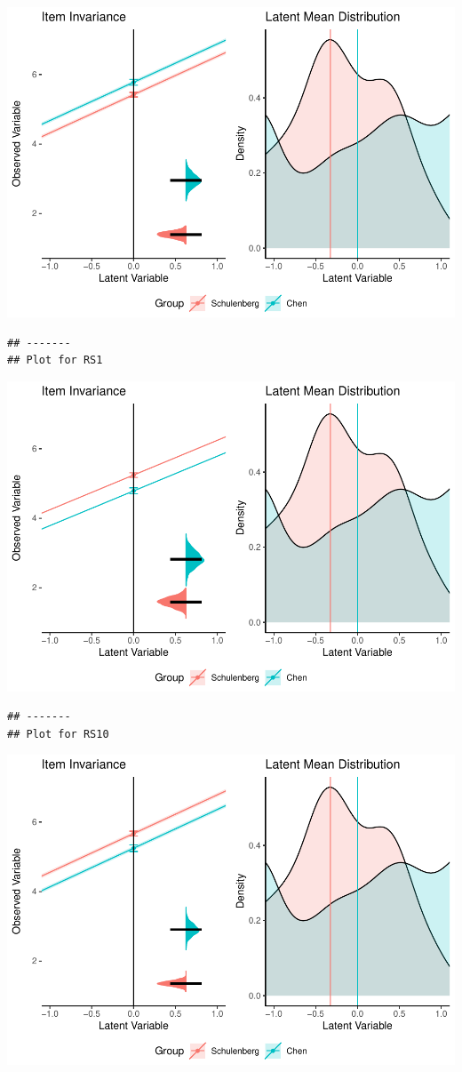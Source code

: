 \documentclass[
  man]{apa7}
\begin{document}
\includegraphics{manuscript_files/figure-latex/unnamed-chunk-107-5.pdf}

\begin{verbatim}
## -------
## Plot for RS1
\end{verbatim}

\includegraphics{manuscript_files/figure-latex/unnamed-chunk-107-6.pdf}

\begin{verbatim}
## -------
## Plot for RS10
\end{verbatim}

\includegraphics{manuscript_files/figure-latex/unnamed-chunk-107-7.pdf}
\end{document}
